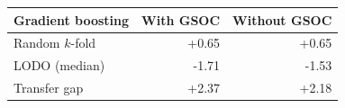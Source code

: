 \begin{tabular}{lrr}
\toprule
Gradient boosting & With GSOC & Without GSOC \\
\midrule
Random $k$-fold & +0.65 & +0.65 \\
LODO (median) & -1.71 & -1.53 \\
Transfer gap & +2.37 & +2.18 \\
\bottomrule
\end{tabular}
